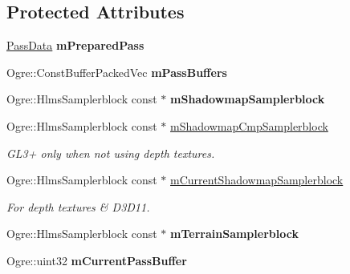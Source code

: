 \subsection*{Protected Attributes}
\begin{DoxyCompactItemize}
\item 
\mbox{\label{class_hlms_terrain_a6cb8159a37119644ab8b11e0325a70a3}} 
\hyperlink{struct_hlms_terrain_1_1_pass_data}{Pass\+Data} {\bfseries m\+Prepared\+Pass}
\item 
\mbox{\label{class_hlms_terrain_a86d07dba3252314bf9447522b64ee864}} 
Ogre\+::\+Const\+Buffer\+Packed\+Vec {\bfseries m\+Pass\+Buffers}
\item 
\mbox{\label{class_hlms_terrain_a9d3ea0ee48cfa834a62afc10a0921f8a}} 
Ogre\+::\+Hlms\+Samplerblock const  $\ast$ {\bfseries m\+Shadowmap\+Samplerblock}
\item 
\mbox{\label{class_hlms_terrain_aade513593295248c1255de720a4d3fb4}} 
Ogre\+::\+Hlms\+Samplerblock const  $\ast$ \hyperlink{class_hlms_terrain_aade513593295248c1255de720a4d3fb4}{m\+Shadowmap\+Cmp\+Samplerblock}
\begin{DoxyCompactList}\small\item\em G\+L3+ only when not using depth textures. \end{DoxyCompactList}\item 
\mbox{\label{class_hlms_terrain_ab779c42bd6b216935b9f85a522f88bd5}} 
Ogre\+::\+Hlms\+Samplerblock const  $\ast$ \hyperlink{class_hlms_terrain_ab779c42bd6b216935b9f85a522f88bd5}{m\+Current\+Shadowmap\+Samplerblock}
\begin{DoxyCompactList}\small\item\em For depth textures \& D3\+D11. \end{DoxyCompactList}\item 
\mbox{\label{class_hlms_terrain_a598b57fadeacacbe48c4e13d1afa6c54}} 
Ogre\+::\+Hlms\+Samplerblock const  $\ast$ {\bfseries m\+Terrain\+Samplerblock}
\item 
\mbox{\label{class_hlms_terrain_a7eb38166903355fc79351b1be8145e49}} 
Ogre\+::uint32 {\bfseries m\+Current\+Pass\+Buffer}

\end{DoxyCompactItemize}
